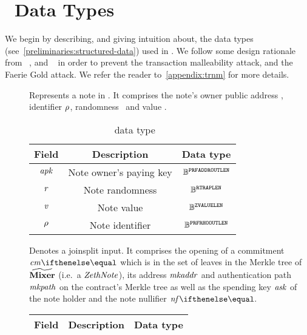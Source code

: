 
\section{\zeth~Data Types}\label{zeth-protocol:zeth-data-types}

We begin by describing, and giving intuition about, the data types (see~\cref{preliminaries:structured-data}) used in \zeth.
We follow some design rationale from \zerocash~\cite{sasson2014zerocash}, and \zcash~\cite{zcashprotocol} in order to prevent the transaction malleability attack, and the Faerie Gold attack\cite[Section 8.4]{zcashprotocol}. We refer the reader to~\cref{appendix:trnm} for more details.

\begin{description}
    \item[\zethNoteDType] Represents a note in \zeth. It comprises the note's owner public address \apk, identifier $\mathit{\rho}$, randomness \noter{}~and value \notev.
        \begin{table}[H]
        \centering
        \begin{tabular}{ccc}
            Field & Description & Data type\\ \toprule
            $\mathit{apk}$ & Note owner's paying key & $\mathbb{B}^{\mathtt{PRFADDROUTLEN}}$\\ \midrule
            $\mathit{r}$ & Note randomness & $\mathbb{B}^{\mathtt{RTRAPLEN}}$\\ \midrule
            $\mathit{v}$ & Note value & $\mathbb{B}^{\mathtt{ZVALUELEN}}$ \\ \midrule
            $\mathit{\rho}$ & Note identifier & $\mathbb{B}^{\mathtt{PRFRHOOUTLEN}}$\\ \bottomrule
        \end{tabular}
        \caption{\zethNoteDType~data type}\label{zeth-protocol:tab:zethnote}
        \end{table}
    \item[\jsInputDType] Denotes a \gls{joinsplit} input. It comprises the opening of a commitment $\cm{}$ which is in the set of leaves in the Merkle tree of $\widetilde{\mathbf{Mixer}}$ (i.e.~a $\mathit{ZethNote}$), its address $\mathit{mkaddr}$ and authentication path $\mathit{mkpath}$ on the contract's Merkle tree as well as the spending key $\mathit{ask}$ of the note holder and the note nullifier $\nf{}$.
        \begin{table}[H]
        \centering
        \begin{tabular}{cp{20em}c}
            Field & Description & Data type\\ \toprule

\end{tabular}
\end{table}
\end{description}
